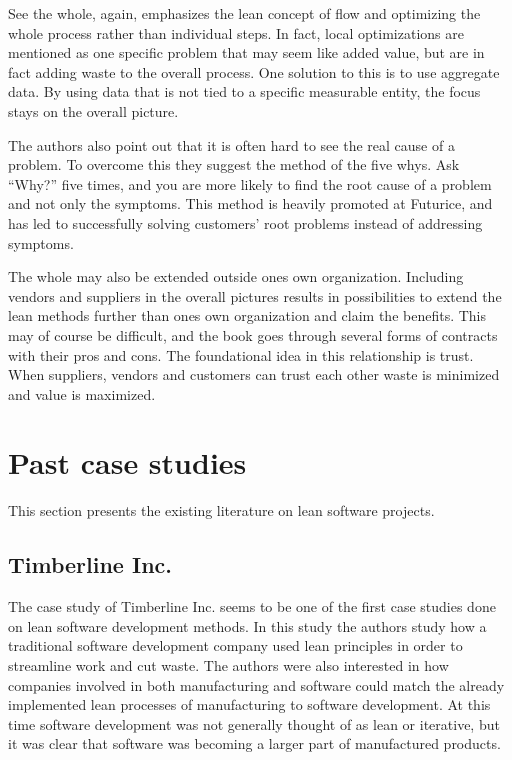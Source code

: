 See the whole, again, emphasizes the lean concept of flow and optimizing the whole process rather than individual steps. In fact, local optimizations are mentioned as one specific problem that may seem like added value, but are in fact adding waste to the overall process. One solution to this is to use aggregate data. By using data that is not tied to a specific measurable entity, the focus stays on the overall picture.\cite{poppendieck2003lean}

The authors also point out that it is often hard to see the real cause of a problem. To overcome this they suggest the method of the five whys. Ask ``Why?'' five times, and you are more likely to find the root cause of a problem and not only the symptoms.\cite{poppendieck2003lean} This method is heavily promoted at Futurice, and has led to successfully solving customers' root problems instead of addressing symptoms.

The whole may also be extended outside ones own organization. Including vendors and suppliers in the overall pictures results in possibilities to extend the lean methods further than ones own organization and claim the benefits. This may of course be difficult, and the book goes through several forms of contracts with their pros and cons. The foundational idea in this relationship is trust. When suppliers, vendors and customers can trust each other waste is minimized and value is maximized.\cite{poppendieck2003lean}


\section{Past case studies}
\label{section:pastleanprojects}

This section presents the existing literature on lean software projects.\\


\subsection{Timberline Inc.}
\label{timberline}

The case study of Timberline Inc. seems to be one of the first case studies done on lean software development methods. In this study the authors study how a traditional software development company used lean principles in order to streamline work and cut waste. The authors were also interested in how companies involved in both manufacturing and software could match the already implemented lean processes of manufacturing to software development. At this time software development was not generally thought of as lean or iterative, but it was clear that software was becoming a larger part of manufactured products.\cite{Middleton2005Lean}

